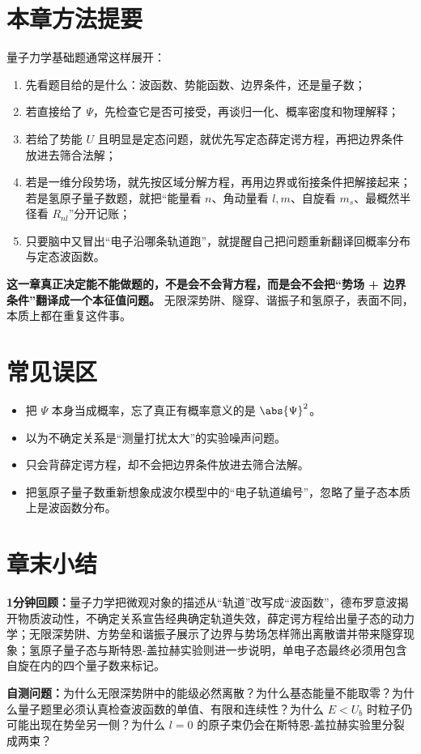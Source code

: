 \documentclass[lang=cn,11pt]{elegantbook}
\newcommand{\summaryline}[1]{\par\noindent\textbf{1分钟回顾：}#1\par}
\newcommand{\chapterselfcheck}[1]{\par\noindent\textbf{自测问题：}#1\par}
\begin{document}
\section{本章方法提要}

量子力学基础题通常这样展开：
\begin{enumerate}
 \item 先看题目给的是什么：波函数、势能函数、边界条件，还是量子数；
 \item 若直接给了 \(\Psi\)，先检查它是否可接受，再谈归一化、概率密度和物理解释；
 \item 若给了势能 \(U\) 且明显是定态问题，就优先写定态薛定谔方程，再把边界条件放进去筛合法解；
 \item 若是一维分段势场，就先按区域分解方程，再用边界或衔接条件把解接起来；若是氢原子量子数题，就把“能量看 \(n\)、角动量看 \(l,m\)、自旋看 \(m_s\)、最概然半径看 \(R_{nl}\)”分开记账；
 \item 只要脑中又冒出“电子沿哪条轨道跑”，就提醒自己把问题重新翻译回概率分布与定态波函数。
\end{enumerate}

\begin{remark}
\textbf{这一章真正决定能不能做题的，不是会不会背方程，而是会不会把“势场 + 边界条件”翻译成一个本征值问题。} 无限深势阱、隧穿、谐振子和氢原子，表面不同，本质上都在重复这件事。
\end{remark}

\section{常见误区}

\begin{itemize}
 \item 把 \(\Psi\) 本身当成概率，忘了真正有概率意义的是 \(\abs{\Psi}^2\)。
 \item 以为不确定关系是“测量打扰太大”的实验噪声问题。
 \item 只会背薛定谔方程，却不会把边界条件放进去筛合法解。
 \item 把氢原子量子数重新想象成波尔模型中的“电子轨道编号”，忽略了量子态本质上是波函数分布。
\end{itemize}

\section{章末小结}

\summaryline{量子力学把微观对象的描述从“轨道”改写成“波函数”，德布罗意波揭开物质波动性，不确定关系宣告经典确定轨道失效，薛定谔方程给出量子态的动力学；无限深势阱、方势垒和谐振子展示了边界与势场怎样筛出离散谱并带来隧穿现象；氢原子量子态与斯特恩-盖拉赫实验则进一步说明，单电子态最终必须用包含自旋在内的四个量子数来标记。}
\chapterselfcheck{为什么无限深势阱中的能级必然离散？为什么基态能量不能取零？为什么量子题里必须认真检查波函数的单值、有限和连续性？为什么 \(E<U_b\) 时粒子仍可能出现在势垒另一侧？为什么 \(l=0\) 的原子束仍会在斯特恩-盖拉赫实验里分裂成两束？}
\end{document}
